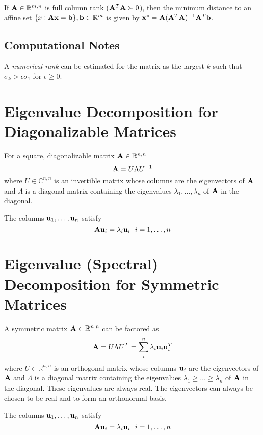 If $\mathbf{A}\in\mathbb{R}^{m,n}$ is full column rank ($\mathbf{A}^T\mathbf{A}\succ0$), then the minimum distance to an affine set $\{x:\mathbf{A}\mathbf{x}=\mathbf{b}\}, \mathbf{b}\in\mathbb{R}^{m}$ is given by $\mathbf{x}^*=\mathbf{A}(\mathbf{A}^T\mathbf{A})^{-1}\mathbf{A}^T\mathbf{b}$. %


\subsection*{Computational Notes}
A \textit{numerical rank} can be estimated for the matrix as the largest $k$ such that $\sigma_k>\epsilon \sigma_1$ for $\epsilon\ge0$.



\section{Eigenvalue Decomposition for Diagonalizable Matrices}

For a square, diagonalizable matrix $\mathbf{A}\in\mathbb{R}^{n,n}$
\begin{equation}
\mathbf{A}=U\Lambda U^{-1}
\end{equation}
where $U\in\mathbb{C}^{n,n}$ is an invertible matrix whose columns are the eigenvectors of $\mathbf{A}$ and $\Lambda$ is a diagonal matrix containing the eigenvalues $\lambda_1,\ldots,\lambda_n$ of $\mathbf{A}$ in the diagonal.

The columns $\mathbf{u}_1,\ldots,\mathbf{u}_n$ satisfy
\begin{equation}
\mathbf{A} \mathbf{u}_i=\lambda_i \mathbf{u}_i~~i=1,\ldots,n
\end{equation}

\section{Eigenvalue (Spectral) Decomposition for Symmetric Matrices}

A symmetric matrix $\mathbf{A}\in\mathbb{R}^{n,n}$ can be factored as
\begin{equation}
\mathbf{A}=U\Lambda U^T=\sum_i^n \lambda_i \mathbf{u}_i \mathbf{u}_i^T
\end{equation}
where $U\in\mathbb{R}^{n,n}$ is an orthogonal matrix whose columns $\mathbf{u}_i$ are the eigenvectors of $\mathbf{A}$ and $\Lambda$ is a diagonal matrix containing the eigenvalues $\lambda_1\ge\ldots\ge\lambda_n$ of $\mathbf{A}$ in the diagonal. These eigenvalues are always real. The eigenvectors can always be chosen to be real and to form an orthonormal basis.

The columns $\mathbf{u}_1,\ldots,\mathbf{u}_n$ satisfy
\begin{equation}
\mathbf{A} \mathbf{u}_i=\lambda_i \mathbf{u}_i~~i=1,\ldots,n
\end{equation}


